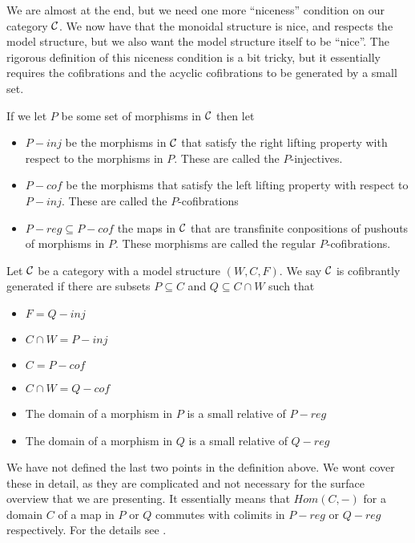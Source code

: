 We are almost at the end, but we need one more ``niceness'' condition on our category $\mathcal{C}$. We now have that the monoidal structure is nice, and respects the model structure, but we also want the model structure itself to be ``nice''. The rigorous definition of this niceness condition is a bit tricky, but it essentially requires the cofibrations and the acyclic cofibrations to be generated by a small set. 

If we let $P$ be some set of morphisms in $\mathcal{C}$ then let 
\begin{itemize}
    \item $P-inj$ be the morphisms in $\mathcal{C}$ that satisfy the right lifting property with respect to the morphisms in $P$. These are called the $P$-injectives.
    \item $P-cof$ be the morphisms that satisfy the left lifting property with respect to $P-inj$. These are called the $P$-cofibrations
    \item $P-reg \subseteq P-cof$ the maps in $\mathcal{C}$ that are transfinite conpositions of pushouts of morphisms in $P$. These morphisms are called the regular $P$-cofibrations. 
\end{itemize}

\begin{definition}
Let $\mathcal{C}$ be a category with a model structure $(W, C, F)$. We say $\mathcal{C}$ is cofibrantly generated if there are subsets $P\subseteq C$ and $Q\subseteq C\cap W$ such that 
\begin{itemize}
    \item $F = Q-inj$
    \item $C\cap W = P-inj$
    \item $C = P-cof$
    \item $C\cap W = Q-cof$ 
    \item The domain of a morphism in $P$ is a small relative of $P-reg$
    \item The domain of a morphism in $Q$ is a small relative of $Q-reg$
\end{itemize}
\end{definition}

We have not defined the last two points in the definition above. We wont cover these in detail, as they are complicated and not necessary for the surface overview that we are presenting. It essentially means that $Hom(C,-)$ for a domain $C$ of a map in $P$ or $Q$ commutes with colimits in $P-reg$ or $Q-reg$ respectively. For the details see \cite{monoid}. 

